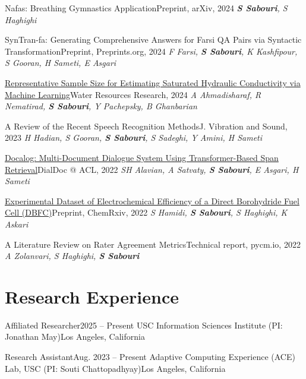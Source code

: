   \cventry
    {Nafas: Breathing Gymnastics Application}{Preprint, arXiv, 2024}
    {\textit{\textbf{S Sabouri}, S Haghighi}}

  \cventry
    {SynTran-fa: Generating Comprehensive Answers for Farsi QA Pairs via Syntactic Transformation}{Preprint, Preprints.org, 2024}
    {\textit{F Farsi, \textbf{S Sabouri}, K Kashfipour, S Gooran, H Sameti, E Asgari}}

  \cventry
    {\href{https://agupubs.onlinelibrary.wiley.com/doi/pdfdirect/10.1029/2023WR036783}{Representative Sample Size for Estimating Saturated Hydraulic Conductivity via Machine Learning}}{Water Resources Research, 2024}
    {\textit{A Ahmadisharaf, R Nematirad, \textbf{S Sabouri}, Y Pachepsky, B Ghanbarian}}

  \cventry
    {A Review of the Recent Speech Recognition Methods}{J. Vibration and Sound, 2023}
    {\textit{H Hadian, S Gooran, \textbf{S Sabouri}, S Sadeghi, Y Amini, H Sameti}}

  \cventry
    {\href{https://aclanthology.org/2022.dialdoc-1.16.pdf}{Docalog: Multi-Document Dialogue System Using Transformer-Based Span Retrieval}}{DialDoc @ ACL, 2022}
    {\textit{SH Alavian, A Satvaty, \textbf{S Sabouri}, E Asgari, H Sameti}}

  \cventry
    {\href{https://chemrxiv.org/engage/api-gateway/chemrxiv/assets/orp/resource/item/60c74a3e469df423a9f43ce2/original/experimental-dataset-of-electrochemical-efficiency-of-a-direct-borohydride-fuel-cell-dbfc-with-pd-c-pt-c-and-pd-decorated-ni-co-r-go-anode-catalysts.pdf}{Experimental Dataset of Electrochemical Efficiency of a Direct Borohydride Fuel Cell (DBFC)}}{Preprint, ChemRxiv, 2022}
    {\textit{S Hamidi, \textbf{S Sabouri}, S Haghighi, K Askari}}

  \cventry
    {A Literature Review on Rater Agreement Metrics}{Technical report, pycm.io, 2022}
    {\textit{A Zolanvari, S Haghighi, \textbf{S Sabouri}}}

\resumeSubHeadingListEnd

\section{Research Experience}
\resumeSubHeadingListStart

  \resumeSubheading
    {Affiliated Researcher}{2025 -- Present}
    {USC Information Sciences Institute (PI: Jonathan May)}{Los Angeles, California}

  \resumeSubheading
    {Research Assistant}{Aug. 2023 -- Present}
    {Adaptive Computing Experience (ACE) Lab, USC (PI: Souti Chattopadhyay)}{Los Angeles, California}

